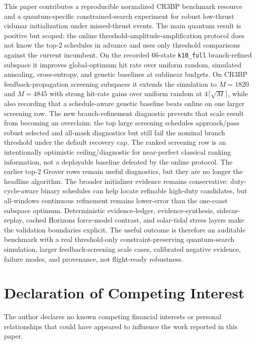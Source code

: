 \documentclass[preprint,12pt]{elsarticle}
\begin{document}
This paper contributes a reproducible normalized CR3BP benchmark resource and a quantum-specific constrained-search experiment for robust low-thrust cislunar initialization under missed-thrust events. The main quantum result is positive but scoped: the online threshold-amplitude-amplification protocol does not know the top-2 schedules in advance and uses only threshold comparisons against the current incumbent. On the recorded 66-state \texttt{k10\_full} branch-refined subspace it improves global-optimum hit rate over uniform random, simulated annealing, cross-entropy, and genetic baselines at sublinear budgets. On CR3BP feedback-propagation screening subspaces it extends the simulation to $M=1820$ and $M=4845$ with strong hit-rate gains over uniform random at $4\lceil\sqrt{M}\rceil$, while also recording that a schedule-aware genetic baseline beats online on one larger screening row. The new branch-refinement diagnostic prevents that scale result from becoming an overclaim: the top large screening schedules approach/pass robust selected and all-mask diagnostics but still fail the nominal branch threshold under the default recovery cap. The ranked screening row is an intentionally optimistic ceiling/diagnostic for near-perfect classical ranking information, not a deployable baseline defeated by the online protocol. The earlier top-2 Grover rows remain useful diagnostics, but they are no longer the headline algorithm. The broader initializer evidence remains conservative: duty-cycle-aware binary schedules can help locate refinable high-duty candidates, but all-windows continuous refinement remains lower-error than the one-coast subspace optimum. Deterministic evidence-ledger, evidence-synthesis, sidecar-replay, cached Horizons force-model contrast, and solar-tidal stress layers make the validation boundaries explicit. The useful outcome is therefore an auditable benchmark with a real threshold-only constraint-preserving quantum-search simulation, larger feedback-screening scale cases, calibrated negative evidence, failure modes, and provenance, not flight-ready robustness.

\section*{Declaration of Competing Interest}
The author declares no known competing financial interests or personal relationships that could have appeared to influence the work reported in this paper.
\end{document}

